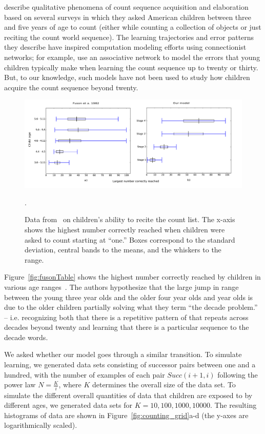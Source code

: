 \documentclass[10pt,letterpaper]{article}
\begin{document}
\citet{FusRicBriar1982} describe qualitative phenomena of
count sequence acquisition and elaboration based on several surveys in
which they asked American children between three and five years of age
to count (either while counting a collection of objects or just
reciting the count world sequence). The learning trajectories and
error patterns they describe have inspired computation modeling
efforts using connectionist networks; for example,
\citet{ma1989modeling} use an associative network to model the errors
that young children typically make when learning the count sequence up
to twenty or thirty. But, to our knowledge, such models have not been
used to study how children acquire the count sequence beyond twenty.


\begin{figure}[t]
\includegraphics[width=0.9\linewidth]{figures/modelboxplot}
\caption{Data from~\citet{FusRicBriar1982} on children's ability to
  recite the count list. The x-axis shows the highest number correctly
  reached when children were asked to count starting at ``one.'' Boxes
  correspond to the standard deviation, central bands to the means,
  and the whiskers to the range.
\label{fig:fuson_count_data}}. 
\end{figure}

Figure~\ref{fig:fusonTable} shows the highest number correctly reached
by children in various age ranges~\cite{FusRicBriar1982}. The authors
hypothesize that the large jump in range between the young three year
olds and the older four year olds and year olds is due to the older
children partially solving what they term ``the decade problem.'' --
i.e. recognizing both that there is a repetitive pattern of that
repeats across decades beyond twenty and learning that there is a
particular sequence to the decade words.

We asked whether our model goes through a similar transition. To
simulate learning, we generated data sets consisting of successor
pairs between one and a hundred, with the number of examples of each
pair $Succ(i+1, i)$ following the power law $N=\frac{K}{i}$, where $K$
determines the overall size of the data set. To simulate the different
overall quantities of data that children are exposed to by different
ages, we generated data sets for $K=10, 100, 1000, 10000$. The
resulting histograms of data are shown in
Figure~\ref{fig:counting_grid}a-d (the y-axes are logarithmically
scaled). 
\end{document}
